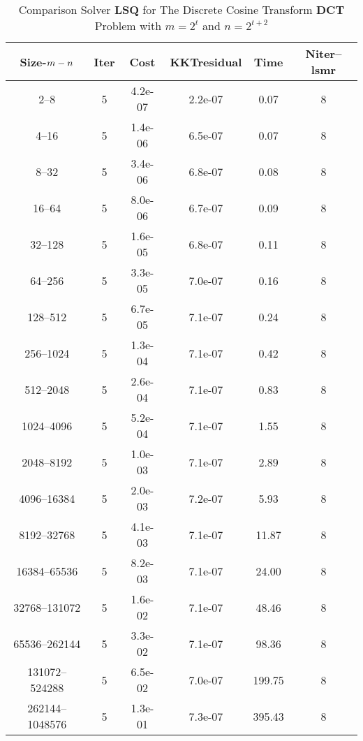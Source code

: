 \begin{table}
\caption{Comparison Solver {\bf LSQ}  for  The Discrete Cosine Transform {\bf DCT} Problem with $m=2^{t}$ and $n=2^{t+2}$}  
\begin{center}
\begin{tabular}{|*{6}{c}|} \hline
Size-$m\--n$ & \multicolumn{1}{c}{Iter} & \multicolumn{1}{c}{Cost}& \multicolumn{1}{c}{KKTresidual} & \multicolumn{1}{c}{Time} & \multicolumn{1}{c|}{Niter--lsmr} \\ 
\hline
2--8           &5    &4.2e-07        &2.2e-07        &0.07           &8    \\ 
4--16          &5    &1.4e-06        &6.5e-07        &0.07           &8    \\ 
8--32          &5    &3.4e-06        &6.8e-07        &0.08           &8    \\ 
16--64         &5    &8.0e-06        &6.7e-07        &0.09           &8    \\ 
32--128        &5    &1.6e-05        &6.8e-07        &0.11           &8    \\ 
64--256        &5    &3.3e-05        &7.0e-07        &0.16           &8    \\ 
128--512       &5    &6.7e-05        &7.1e-07        &0.24           &8    \\ 
256--1024      &5    &1.3e-04        &7.1e-07        &0.42           &8    \\ 
512--2048      &5    &2.6e-04        &7.1e-07        &0.83           &8    \\ 
1024--4096     &5    &5.2e-04        &7.1e-07        &1.55           &8    \\ 
2048--8192     &5    &1.0e-03        &7.1e-07        &2.89           &8    \\ 
4096--16384    &5    &2.0e-03        &7.2e-07        &5.93           &8    \\ 
8192--32768    &5    &4.1e-03        &7.1e-07        &11.87          &8    \\ 
16384--65536   &5    &8.2e-03        &7.1e-07        &24.00          &8    \\ 
32768--131072  &5    &1.6e-02        &7.1e-07        &48.46          &8    \\ 
65536--262144  &5    &3.3e-02        &7.1e-07        &98.36          &8    \\ 
131072--524288 &5    &6.5e-02        &7.0e-07        &199.75         &8    \\ 
262144--1048576&5    &1.3e-01        &7.3e-07        &395.43         &8    \\ 


\end{tabular}
\end{center}
\end{table}
